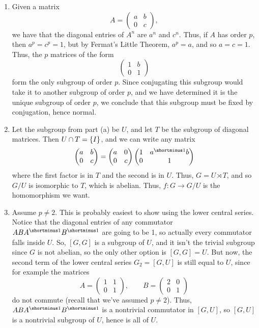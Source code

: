 \begin{solution}
\begin{enumerate}
    \item Given a matrix
    \[A = \begin{pmatrix}a&b\\0&c \end{pmatrix},\]
    we have that the diagonal entries of $A^n$ are $a^n$ and $c^n$. Thus, if $A$ has order $p$, then $a^p = c^p = 1$, but by Fermat's Little Theorem, $a^p = a$, and so $a = c = 1$. Thus, the $p$ matrices of the form
    \[\begin{pmatrix} 1 & b\\ 0 & 1 \end{pmatrix}\]
    form the only subgroup of order $p$. Since conjugating this subgroup would take it to another subgroup of order $p$, and we have determined it is the unique subgroup of order $p$, we conclude that this subgroup must be fixed by conjugation, hence normal.
    \item Let the subgroup from part (a) be $U$, and let $T$ be the subgroup of diagonal matrices. Then $U \cap T = \{I\}$, and we can write any matrix
    \[\begin{pmatrix} a&b\\0&c \end{pmatrix} = \begin{pmatrix} a& 0\\0 & c\end{pmatrix} \begin{pmatrix} 1 & a\inv b\\0& 1 \end{pmatrix}\]
    where the first factor is in $T$ and the second is in $U$. Thus, $G = U \rtimes T$, and so $G/U$ is isomorphic to $T$, which is abelian. Thus, $f\colon G \to G/U$ is the homomorphism we want.
    \item Assume $p \neq 2$. This is probably easiest to show using the lower central series. Notice that the diagonal entries of any commutator $ABA\inv B\inv$ are going to be 1, so actually every commutator falls inside $U$. So, $[G,G]$ is a subgroup of $U$, and it isn't the trivial subgroup since $G$ is not abelian, so the only other option is $[G,G] = U$. But now, the second term of the lower central series $G_2 = [G,U]$ is still equal to $U$, since for example the matrices
    \[A = \begin{pmatrix} 1&1\\0&1\end{pmatrix}, \qquad B = \begin{pmatrix}2&0\\0&1 \end{pmatrix}\]
    do not commute (recall that we've assumed $p \neq 2$). Thus, $ABA\inv B\inv$ is a nontrivial commutator in $[G,U]$, so $[G,U]$ is a nontrivial subgroup of $U$, hence is all of $U$.
\end{enumerate}
\end{solution}

